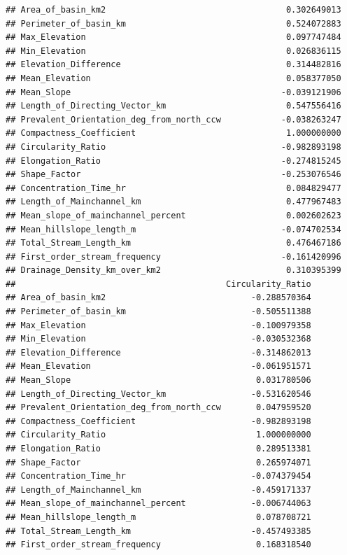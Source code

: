 \documentclass[11pt,]{article}
\begin{document}
\begin{verbatim}
## Area_of_basin_km2                                    0.302649013
## Perimeter_of_basin_km                                0.524072883
## Max_Elevation                                        0.097747484
## Min_Elevation                                        0.026836115
## Elevation_Difference                                 0.314482816
## Mean_Elevation                                       0.058377050
## Mean_Slope                                          -0.039121906
## Length_of_Directing_Vector_km                        0.547556416
## Prevalent_Orientation_deg_from_north_ccw            -0.038263247
## Compactness_Coefficient                              1.000000000
## Circularity_Ratio                                   -0.982893198
## Elongation_Ratio                                    -0.274815245
## Shape_Factor                                        -0.253076546
## Concentration_Time_hr                                0.084829477
## Length_of_Mainchannel_km                             0.477967483
## Mean_slope_of_mainchannel_percent                    0.002602623
## Mean_hillslope_length_m                             -0.074702534
## Total_Stream_Length_km                               0.476467186
## First_order_stream_frequency                        -0.161420996
## Drainage_Density_km_over_km2                         0.310395399
##                                          Circularity_Ratio
## Area_of_basin_km2                             -0.288570364
## Perimeter_of_basin_km                         -0.505511388
## Max_Elevation                                 -0.100979358
## Min_Elevation                                 -0.030532368
## Elevation_Difference                          -0.314862013
## Mean_Elevation                                -0.061951571
## Mean_Slope                                     0.031780506
## Length_of_Directing_Vector_km                 -0.531620546
## Prevalent_Orientation_deg_from_north_ccw       0.047959520
## Compactness_Coefficient                       -0.982893198
## Circularity_Ratio                              1.000000000
## Elongation_Ratio                               0.289513381
## Shape_Factor                                   0.265974071
## Concentration_Time_hr                         -0.074379454
## Length_of_Mainchannel_km                      -0.459171337
## Mean_slope_of_mainchannel_percent             -0.006744063
## Mean_hillslope_length_m                        0.078708721
## Total_Stream_Length_km                        -0.457493385
## First_order_stream_frequency                   0.168318540

\end{verbatim}
\end{document}
